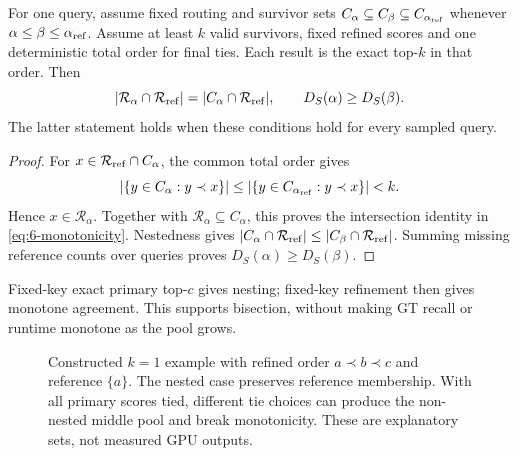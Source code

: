 \par\noindent\begin{minipage}{\linewidth}
\begin{proposition}
\label{prop:6-monotonicity}
For one query, assume fixed routing and survivor sets
$C_\alpha\subseteq C_\beta\subseteq C_{\alpha_{\rm ref}}$ whenever
$\alpha\leq\beta\leq\alpha_{\rm ref}$. Assume at least $k$ valid
survivors, fixed refined scores and one deterministic total order for
final ties. Each result is the exact top-$k$ in that order. Then
\begin{equation}
 |\mathcal R_\alpha\cap\mathcal R_{\rm ref}|
 =|C_\alpha\cap\mathcal R_{\rm ref}|,
 \qquad D_S(\alpha)\geq D_S(\beta).
 \label{eq:6-monotonicity}
\end{equation}
The latter statement holds when these conditions hold for every sampled
query.
\end{proposition}
\begin{proof}
For $x\in\mathcal R_{\rm ref}\cap C_\alpha$, the common total order gives
\begin{equation*}
 |\{y\in C_\alpha:y\prec x\}|
 \leq|\{y\in C_{\alpha_{\rm ref}}:y\prec x\}|<k.
\end{equation*}
Hence $x\in\mathcal R_\alpha$. Together with
$\mathcal R_\alpha\subseteq C_\alpha$, this proves the intersection
identity in \cref{eq:6-monotonicity}. Nestedness gives
$|C_\alpha\cap\mathcal R_{\rm ref}|
 \leq|C_\beta\cap\mathcal R_{\rm ref}|$.
Summing missing reference counts over queries proves
$D_S(\alpha)\geq D_S(\beta)$.
\end{proof}
\end{minipage}\par\medskip

Fixed-key exact primary top-$c$ gives nesting; fixed-key refinement then gives monotone agreement. This supports bisection, without making GT recall or runtime monotone as the pool grows.

\begin{figure}[tbp]
\centering

\caption[Nested and non-nested candidate pools]{Constructed $k=1$ example with refined order $a\prec b\prec c$
and reference $\{a\}$. The nested case preserves reference membership.
With all primary scores tied, different tie choices can produce the
non-nested middle pool and break monotonicity. These are explanatory
sets, not measured GPU outputs.}
\label{fig:6-nesting}
\end{figure}

